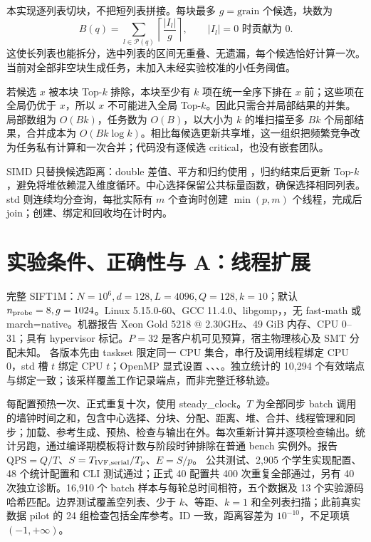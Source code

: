 本实现逐列表切块，不把短列表拼接。每块最多 $g=\mathrm{grain}$ 个候选，块数为
\[
B(q)=\sum_{l\in\mathcal P(q)}\left\lceil\frac{|I_l|}{g}\right\rceil,
\qquad |I_l|=0\text{ 时贡献为 }0.
\]
这使长列表也能拆分，选中列表的区间无重叠、无遗漏，每个候选恰好计算一次。当前对全部非空块生成任务，未加入未经实验校准的小任务阈值。

若候选 $x$ 被本块 Top-$k$ 排除，本块至少有 $k$ 项在统一全序下排在 $x$ 前；这些项在全局仍优于 $x$，所以 $x$ 不可能进入全局 Top-$k$。因此只需合并局部结果的并集。
局部数组为 $O(Bk)$，任务数为 $O(B)$，以大小为 $k$ 的堆扫描至多 $Bk$ 个局部结果，合并成本为 $O(Bk\log k)$。相比每候选更新共享堆，这一组织把频繁竞争改为任务私有计算和一次合并；代码没有逐候选 critical，也没有嵌套团队。

SIMD 只替换候选距离：double 差值、平方和归约使用 ，归约结束后更新 Top-$k$，避免将堆依赖混入维度循环。中心选择保留公共标量函数，确保选择相同列表。std 则连续均分查询，每批实际有 $m$ 个查询时创建 $\min(p,m)$ 个线程，完成后 join；创建、绑定和回收均在计时内。

\newpage
\section{实验条件、正确性与 A：线程扩展}
完整 SIFT1M：$N=10^6,d=128,L=4096,Q=128,k=10$；默认 $n_{\rm probe}=8,g=1024$。Linux 5.15.0-60、GCC 11.4.0、libgomp，，无 fast-math 或 march=native。机器报告 Xeon Gold 5218 @ 2.30GHz、49 GiB 内存、CPU 0--31；具有 hypervisor 标记。$P=32$ 是客户机可见预算，宿主物理核心及 SMT 分配未知。
各版本先由 taskset 限定同一 CPU 集合，串行及调用线程绑定 CPU 0，std 槽 $t$ 绑定 CPU $t$；OpenMP 显式设置 、、、。独立统计的 10,294 个有效端点与绑定一致；该采样覆盖工作记录端点，而非完整迁移轨迹。

每配置预热一次、正式重复十次，使用 steady\_clock。$T$ 为全部同步 batch 调用的墙钟时间之和，包含中心选择、分块、分配、距离、堆、合并、线程管理和同步；加载、参考生成、预热、检查与输出在外。每次重新计算并逐项检查输出。统计另跑，通过编译期模板将计数与阶段时钟排除在普通 bench 实例外。报告 $\mathrm{QPS}=Q/T$、$S=T_{\rm IVF,serial}/T_p$、$E=S/p$。
公共测试、2,905 个学生实现配置、48 个统计配置和 CLI 测试通过；正式 40 配置共 400 次重复全部通过，另有 40 次独立诊断。16,910 个 batch 样本与每轮总时间相符，五个数据及 13 个实验源码哈希匹配。边界测试覆盖空列表、少于 $k$、等距、$k=1$ 和全列表扫描；此前真实数据 pilot 的 24 组检查包括全库参考。ID 一致，距离容差为 $10^{-10}$，不足项填 $(-1,+\infty)$。

